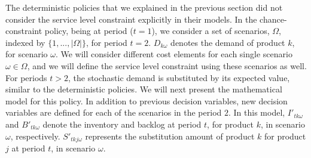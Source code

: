 \documentclass[10pt]{article}
\newcommand{\ti}{t} %
\newcommand{\ka}{k} %
\newcommand{\jey}{j} %
\newcommand{\Es}{S} %
\newcommand{\m}{\omega} %
\newcommand{\EM}{\Omega} %
\begin{document}
The deterministic policies that we explained in the previous section did not consider the service level constraint explicitly in their models.
In the chance-constraint policy, being at period ($\ti =1$), we consider a set of scenarios, $\EM$, indexed by $\{1,...,|\EM|\}$,  for period $\ti =2$. $D_{\ka \m}$ denotes the demand of product $\ka$, for scenario $\m$. We will consider different cost elements for each single scenario $\m \in \EM$, and we will define the service level constraint using these scenarios as well.  
For periods $\ti > 2$, the stochastic demand is substituted by its expected value, similar to the deterministic policies. We will next present the mathematical model for this policy. In addition to previous decision variables, new decision variables are defined for each of the scenarios in the period $2$. In this model, $I'_{\ti \ka \m}$ and $B'_{\ti \ka \m}$ denote the inventory and backlog at period $\ti$, for product $\ka$, in scenario $\m$, respectively. $\Es'_{\ti \ka \jey \m}$ represents the substitution amount of product $\ka$ for product $\jey$ at period $\ti$, in scenario $\m$.
\end{document}

